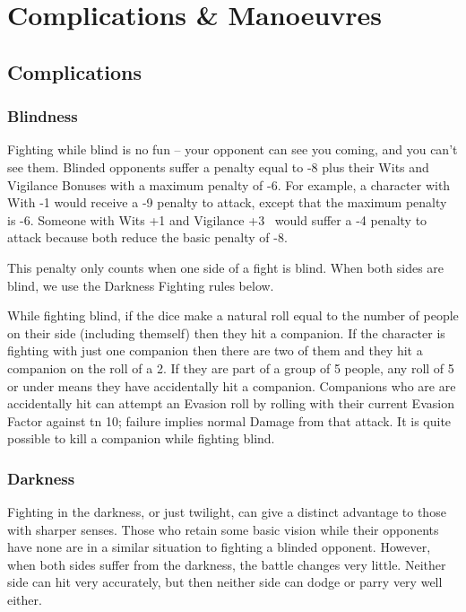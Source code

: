 \section{Complications \& Manoeuvres}

\begin{multicols}{2}

\subsection{Complications}

\subsubsection{Blindness}

Fighting while blind is no fun -- your opponent can see you coming, and you can't see them. Blinded opponents suffer a penalty equal to -8 plus their Wits and Vigilance Bonuses with a maximum penalty of -6. For example, a character with With -1 would receive a -9 penalty to attack, except that the maximum penalty is -6. Someone with Wits +1 and Vigilance +3 \ would suffer a -4 penalty to attack because both reduce the basic penalty of -8.

This penalty only counts when one side of a fight is blind. When both sides are blind, we use the Darkness Fighting rules below.

While fighting blind, if the dice make a \gls{natural} roll equal to the number of people on their side (including themself) then they hit a companion. If the character is fighting with just one companion then there are two of them and they hit a companion on the roll of a 2. If they are part of a group of 5 people, any roll of 5 or under means they have accidentally hit a companion. Companions who are are accidentally hit can attempt an Evasion roll by rolling with their current Evasion Factor against \gls{tn} 10; failure implies normal Damage from that attack. It is quite possible to kill a companion while fighting blind.

\subsubsection{Darkness}\label{darkness}

Fighting in the darkness, or just twilight, can give a distinct advantage to those with sharper senses.
Those who retain some basic vision while their opponents have none are in a similar situation to fighting a blinded opponent.
However, when both sides suffer from the darkness, the battle changes very little.
Neither side can hit very accurately, but then neither side can dodge or parry very well either.


\end{multicols}
